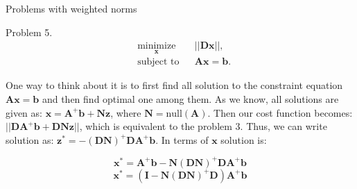 \documentclass{beamer}
\begin{document}
\begin{frame}{Problems with weighted norms}
\begin{flushleft}

Problem 5. 
%
\begin{equation}
\begin{aligned}
& \underset{\mathbf{x}}{\text{minimize}}
& & || \mathbf{D}\mathbf{x} ||, \\
& \text{subject to}
& & \mathbf{A} \mathbf{x} = \mathbf{b}.
\end{aligned}
\end{equation}

One way to think about it is to first find all solution to the constraint equation $\mathbf{A} \mathbf{x} = \mathbf{b}$ and then find optimal one among them. As we know, all solutions are given as: $\mathbf{x} = \mathbf{A}^+\mathbf{b} + \mathbf{N}\mathbf{z}$, where $\mathbf{N} = \text{null}(\mathbf{A})$. Then our cost function becomes: $|| \mathbf{D}\mathbf{A}^+\mathbf{b} +  \mathbf{D}\mathbf{N}\mathbf{z} ||$, which is equivalent to the problem 3. Thus, we can write solution as: 
$\mathbf{z}^* = -(\mathbf{D}\mathbf{N})^+ \mathbf{D}\mathbf{A}^+\mathbf{b}$. In terms of $\mathbf{x}$ solution is:

\begin{equation}
    \mathbf{x}^* = \mathbf{A}^+\mathbf{b}-\mathbf{N}(\mathbf{D}\mathbf{N})^+ \mathbf{D}\mathbf{A}^+\mathbf{b}
\end{equation}
\begin{equation}
	\mathbf{x}^* =( \mathbf{I}-\mathbf{N}(\mathbf{D}\mathbf{N})^+ \mathbf{D})\mathbf{A}^+\mathbf{b}
\end{equation}

\end{flushleft}
\end{frame}
\end{document}
